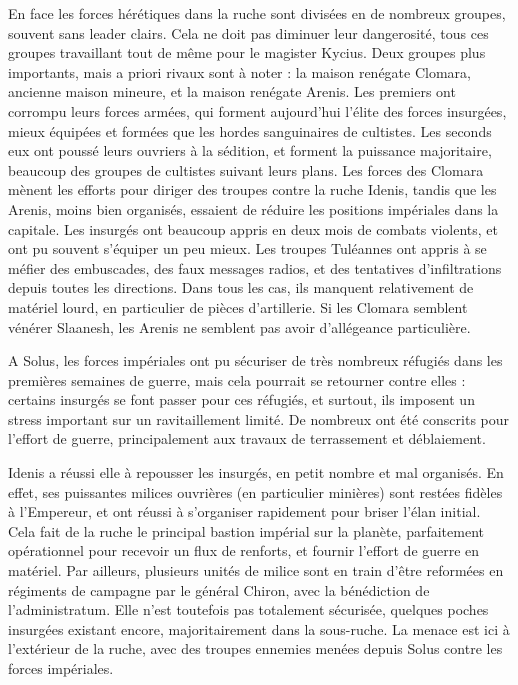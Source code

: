 \documentclass[10pt,a4paper]{book}
\begin{document}
En face les forces hérétiques dans la ruche sont divisées en de nombreux groupes, souvent sans leader clairs. Cela ne doit pas diminuer leur dangerosité, tous ces groupes travaillant tout de même pour le magister Kycius. Deux groupes plus importants, mais a priori rivaux sont à noter : la maison renégate Clomara, ancienne maison mineure, et la maison renégate Arenis. Les premiers ont corrompu leurs forces armées, qui forment aujourd'hui l'élite des forces insurgées, mieux équipées et formées que les hordes sanguinaires de cultistes. Les seconds eux ont poussé leurs ouvriers à la sédition, et forment la puissance majoritaire, beaucoup des groupes de cultistes suivant leurs plans. Les forces des Clomara mènent les efforts pour diriger des troupes contre la ruche Idenis, tandis que les Arenis, moins bien organisés, essaient de réduire les positions impériales dans la capitale. Les insurgés ont beaucoup appris en deux mois de combats violents, et ont pu souvent s'équiper un peu mieux. Les troupes Tuléannes ont appris à se méfier des embuscades, des faux messages radios, et des tentatives d'infiltrations depuis toutes les directions. Dans tous les cas, ils manquent relativement de matériel lourd, en particulier de pièces d'artillerie. Si les Clomara semblent vénérer Slaanesh, les Arenis ne semblent pas avoir d'allégeance particulière.

A Solus, les forces impériales ont pu sécuriser de très nombreux réfugiés dans les premières semaines de guerre, mais cela pourrait se retourner contre elles : certains insurgés se font passer pour ces réfugiés, et surtout, ils imposent un stress important sur un ravitaillement limité. De nombreux ont été conscrits pour l'effort de guerre, principalement aux travaux de terrassement et déblaiement.

Idenis a réussi elle à repousser les insurgés, en petit nombre et mal organisés. En effet, ses puissantes milices ouvrières (en particulier minières) sont restées fidèles à l'Empereur, et ont réussi à s'organiser rapidement pour briser l'élan initial. Cela fait de la ruche le principal bastion impérial sur la planète, parfaitement opérationnel pour recevoir un flux de renforts, et fournir l'effort de guerre en matériel. Par ailleurs, plusieurs unités de milice sont en train d'être reformées en régiments de campagne par le général Chiron, avec la bénédiction de l'administratum. Elle n'est toutefois pas totalement sécurisée, quelques poches insurgées existant encore, majoritairement dans la sous-ruche. La menace est ici à l'extérieur de la ruche, avec des troupes ennemies menées depuis Solus contre les forces impériales. 
\end{document}
